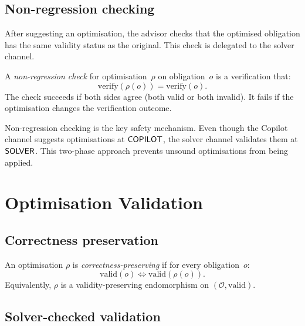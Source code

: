 \documentclass[11pt]{article}
\begin{document}
\subsection{Non-regression checking}

After suggesting an optimisation, the advisor checks
that the optimised obligation has the same validity
status as the original.  This check is delegated to
the solver channel.

\begin{definition}\label{def:nonreg}
A \emph{non-regression check} for optimisation~$\rho$
on obligation~$o$ is a verification that:
\[
  \mathrm{verify}(\rho(o)) = \mathrm{verify}(o).
\]
The check succeeds if both sides agree (both valid or
both invalid).  It fails if the optimisation changes
the verification outcome.
\end{definition}

\begin{remark}
Non-regression checking is the key safety mechanism.
Even though the Copilot channel suggests optimisations
at $\mathsf{COPILOT}$, the solver channel validates them at
$\mathsf{SOLVER}$.  This two-phase approach prevents unsound
optimisations from being applied.
\end{remark}

\section{Optimisation Validation}\label{sec:validation}

\subsection{Correctness preservation}

\begin{definition}%
\label{def:corrpres}
An optimisation $\rho$ is \emph{correctness-preserving}
if for every obligation~$o$:
\[
  \mathrm{valid}(o) \iff \mathrm{valid}(\rho(o)).
\]
Equivalently, $\rho$ is a validity-preserving endomorphism
on $(\mathcal{O}, \mathrm{valid})$.
\end{definition}

\subsection{Solver-checked validation}
\end{document}
